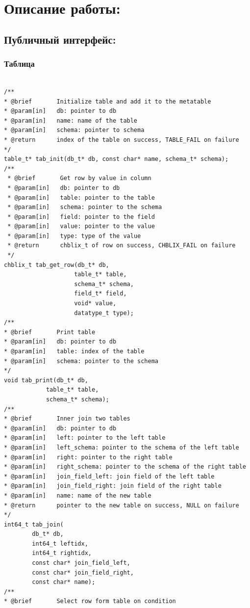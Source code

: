 \documentclass[12pt,onecolumn]{article}
\begin{document}
\section{Описание работы:}
\subsection{Публичный интерфейс:}
\subsubsection{Таблица}
\begin{lstlisting}[style=C]

/**
* @brief       Initialize table and add it to the metatable
* @param[in]   db: pointer to db
* @param[in]   name: name of the table
* @param[in]   schema: pointer to schema
* @return      index of the table on success, TABLE_FAIL on failure
*/
table_t* tab_init(db_t* db, const char* name, schema_t* schema);
/**
 * @brief       Get row by value in column
 * @param[in]   db: pointer to db
 * @param[in]   table: pointer to the table
 * @param[in]   schema: pointer to the schema
 * @param[in]   field: pointer to the field
 * @param[in]   value: pointer to the value
 * @param[in]   type: type of the value
 * @return      chblix_t of row on success, CHBLIX_FAIL on failure
 */
chblix_t tab_get_row(db_t* db,
                    table_t* table,
                    schema_t* schema, 
                    field_t* field, 
                    void* value, 
                    datatype_t type);
/**
* @brief       Print table
* @param[in]   db: pointer to db
* @param[in]   table: index of the table
* @param[in]   schema: pointer to the schema
*/
void tab_print(db_t* db, 
            table_t* table,
            schema_t* schema);
/**
* @brief       Inner join two tables
* @param[in]   db: pointer to db
* @param[in]   left: pointer to the left table
* @param[in]   left_schema: pointer to the schema of the left table
* @param[in]   right: pointer to the right table
* @param[in]   right_schema: pointer to the schema of the right table
* @param[in]   join_field_left: join field of the left table
* @param[in]   join_field_right: join field of the right table
* @param[in]   name: name of the new table
* @return      pointer to the new table on success, NULL on failure
*/                                  
int64_t tab_join(
        db_t* db,
        int64_t leftidx,
        int64_t rightidx,
        const char* join_field_left,
        const char* join_field_right,
        const char* name);
/**
* @brief       Select row form table on condition

\end{lstlisting}
\end{document}
